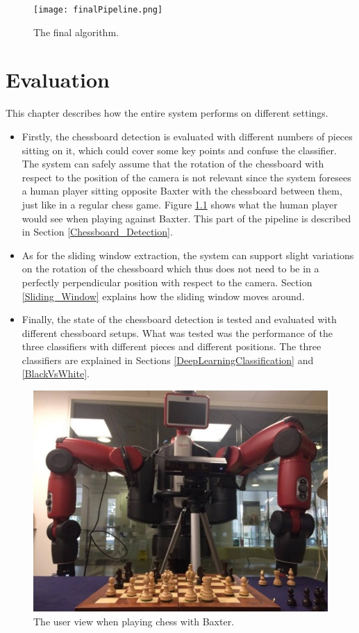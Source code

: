 \documentclass{l4proj}
\begin{document}
\begin{figure}[h!]
\centering
\texttt{[image: finalPipeline.png]}
\caption{The final algorithm.}
\label{Pipeline}
\end{figure}

\chapter{Evaluation} \label{Evaluation}
\vspace{-5mm}
This chapter describes how the entire system performs on different settings. 
\begin{itemize}

	\item Firstly, the chessboard detection is evaluated with different numbers of pieces sitting on it, which could cover some key points and confuse the classifier. The system can safely assume that the rotation of the chessboard with respect to the position of the camera is not relevant since the system foresees a human player sitting opposite Baxter with the chessboard between them, just like in a regular chess game. Figure \ref{BaxterAndChessboard} shows what the human player would see when playing against Baxter. This part of the pipeline is described in Section \ref{Chessboard_Detection}.
	\item As for the sliding window extraction, the system can support slight variations on the rotation of the chessboard which thus does not need to be in a perfectly perpendicular position with respect to the camera. Section \ref{Sliding_Window} explains how the sliding window moves around.
	\item Finally, the state of the chessboard detection is tested and evaluated with different chessboard setups. What was tested was the performance of the three classifiers with different pieces and different positions. The three classifiers are explained in Sections \ref{DeepLearningClassification} and \ref{BlackVsWhite}.

\end{itemize}

\begin{figure}[h!]
\centering
\includegraphics[scale=0.42]{BaxterWithChessboard.jpg}
\caption{The user view when playing chess with Baxter.}
\label{BaxterAndChessboard}
\end{figure}
\end{document}
